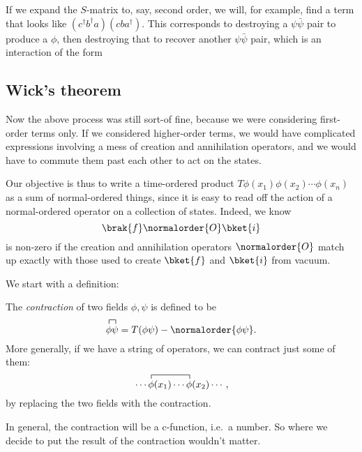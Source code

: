 \documentclass[a4paper]{article}
\begin{document}
If we expand the $S$-matrix to, say, second order, we will, for example, find a term that looks like $(c^\dagger b^\dagger a)(cba^\dagger)$. This corresponds to destroying a $\psi \bar{\psi}$ pair to produce a $\phi$, then destroying that to recover another $\psi \bar\psi$ pair, which is an interaction of the form
\begin{center}
\end{center}

\subsection{Wick's theorem}
Now the above process was still sort-of fine, because we were considering first-order terms only. If we considered higher-order terms, we would have complicated expressions involving a mess of creation and annihilation operators, and we would have to commute them past each other to act on the states.

Our objective is thus to write a time-ordered product $T \phi(x_1) \phi(x_2) \cdots \phi(x_n)$ as a sum of normal-ordered things, since it is easy to read off the action of a normal-ordered operator on a collection of states. Indeed, we know
\[
  \brak{f}\normalorder{O}\bket{i}
\]
is non-zero if the creation and annihilation operators $\normalorder{O}$ match up exactly with those used to create $\bket{f}$ and $\bket{i}$ from vacuum.

We start with a definition:
\begin{defi}[Contraction]
  The \emph{contraction} of two fields $\phi, \psi$ is defined to be
  \[
    \contraction{}{\phi}{}{\psi}\phi\psi = T(\phi\psi) - \normalorder{\phi\psi}.
  \]
  More generally, if we have a string of operators, we can contract just some of them:
  \[
    \contraction{\cdots}{\phi}{(x_1) \cdots}{\phi}\cdots\phi(x_1) \cdots \phi(x_2) \cdots,
  \]
  by replacing the two fields with the contraction.

  In general, the contraction will be a c-function, i.e.\ a number. So where we decide to put the result of the contraction wouldn't matter.
\end{defi}
\end{document}
